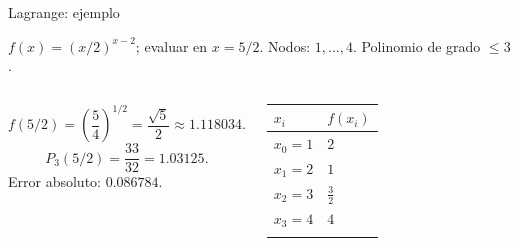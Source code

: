 \documentclass[main.tex]{subfiles}
\begin{document}
\begin{frame}[t]{Lagrange: ejemplo}
\par\noindent\begin{minipage}[t][7.5mm][t]{\textwidth}\small\strut $f(x)=(x/2)^{x-2}$; evaluar en $x=5/2$. Nodos: $1,\ldots,4$. Polinomio de grado $\le 3$.\end{minipage}\par\nointerlineskip
\begin{columns}[T]\small\setlength{\abovedisplayskip}{4pt}\setlength{\belowdisplayskip}{4pt}\[f(5/2)=\left(\frac54\right)^{1/2}=\frac{\sqrt5}{2}\approx1.118034.\]\[P_3(5/2)=\frac{33}{32}=1.03125.\]\small Error absoluto: $0.086784$.\begingroup\small\setlength{\tabcolsep}{3pt}\begin{center}\begin{tabular}{|C{.42\textwidth}|C{.42\textwidth}|}\hline
\rule[-2mm]{0pt}{6mm}$x_i$&$f(x_i)$\\\hline
\rule[-2.5mm]{0pt}{6mm}$x_0=1$&$2$\\\hline
\rule[-2.5mm]{0pt}{6mm}$x_1=2$&$1$\\\hline
\rule[-2.5mm]{0pt}{6mm}$x_2=3$&$\frac{3}{2}$\\\hline
\rule[-2.5mm]{0pt}{6mm}$x_3=4$&$4$\\\hline
\rule[-2.5mm]{0pt}{6mm}&\\\hline
\end{tabular}\end{center}\endgroup\par
\end{columns}
\end{frame}
\end{document}
